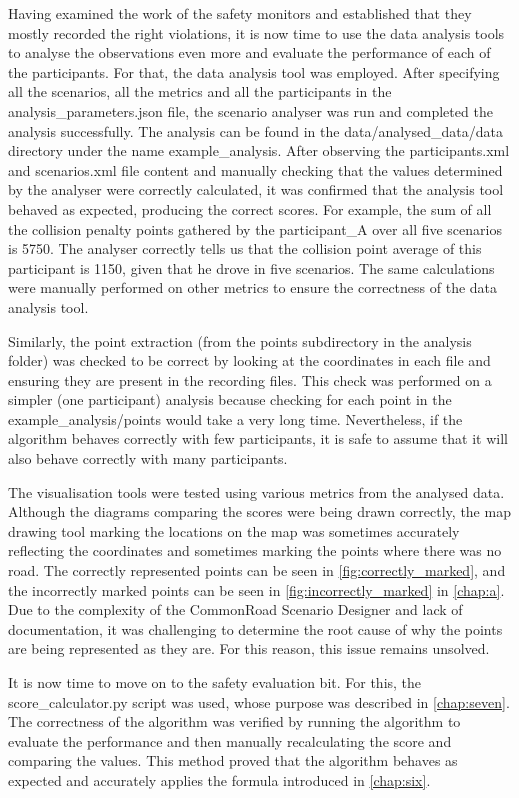 Having examined the work of the safety monitors and established that they mostly recorded the right violations, it is now time to use the data analysis tools to analyse the observations even more and evaluate the performance of each of the participants. For that, the data analysis tool was employed. After specifying all the scenarios, all the metrics and all the participants in the analysis\_parameters.json file, the scenario analyser was run and completed the analysis successfully. The analysis can be found in the data/analysed\_data/data directory under the name example\_analysis. After observing the participants.xml and scenarios.xml file content and manually checking that the values determined by the analyser were correctly calculated, it was confirmed that the analysis tool behaved as expected, producing the correct scores. For example, the sum of all the collision penalty points gathered by the participant\_A over all five scenarios is 5750. The analyser correctly tells us that the collision point average of this participant is 1150, given that he drove in five scenarios. The same calculations were manually performed on other metrics to ensure the correctness of the data analysis tool.

Similarly, the point extraction (from the points subdirectory in the analysis folder) was checked to be correct by looking at the coordinates in each file and ensuring they are present in the recording files. This check was performed on a simpler (one participant) analysis because checking for each point in the example\_analysis/points would take a very long time. Nevertheless, if the algorithm behaves correctly with few participants, it is safe to assume that it will also behave correctly with many participants.

The visualisation tools were tested using various metrics from the analysed data. Although the diagrams comparing the scores were being drawn correctly, the map drawing tool marking the locations on the map was sometimes accurately reflecting the coordinates and sometimes marking the points where there was no road. The correctly represented points can be seen in \autoref{fig:correctly_marked}, and the incorrectly marked points can be seen in  \autoref{fig:incorrectly_marked} in \autoref{chap:a}. Due to the complexity of the CommonRoad Scenario Designer and lack of documentation, it was challenging to determine the root cause of why the points are being represented as they are. For this reason, this issue remains unsolved.

It is now time to move on to the safety evaluation bit. For this, the score\_calculator.py script was used, whose purpose was described in \autoref{chap:seven}. The correctness of the algorithm was verified by running the algorithm to evaluate the performance and then manually recalculating the score and comparing the values. This method proved that the algorithm behaves as expected and accurately applies the formula introduced in \autoref{chap:six}.

